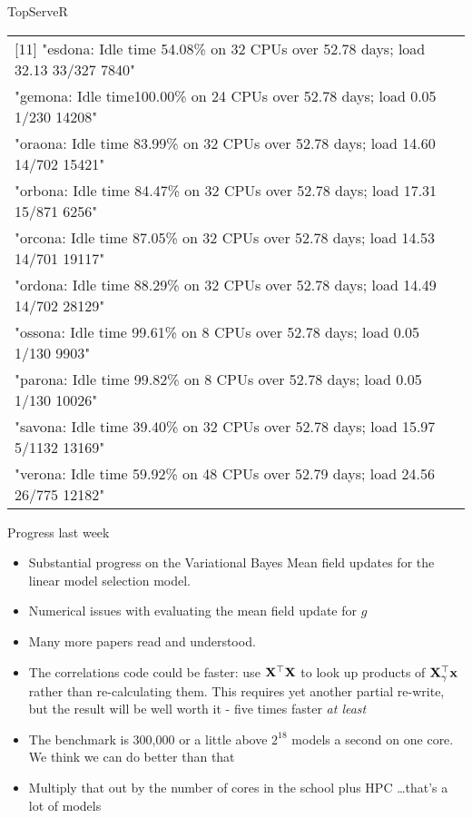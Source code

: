 \documentclass{beamer}
\begin{document}
\begin{frame}{TopServeR}
\begin{itemize}
\begin{tabular}{l}
[11] "esdona: Idle time 54.08\% on 32 CPUs over  52.78 days; load 32.13 33/327 7840"  \\
[12] "gemona: Idle time100.00\% on 24 CPUs over  52.78 days; load 0.05 1/230 14208"   \\
[13] "oraona: Idle time 83.99\% on 32 CPUs over  52.78 days; load 14.60 14/702 15421" \\
[14] "orbona: Idle time 84.47\% on 32 CPUs over  52.78 days; load 17.31 15/871 6256"  \\
[15] "orcona: Idle time 87.05\% on 32 CPUs over  52.78 days; load 14.53 14/701 19117" \\
[16] "ordona: Idle time 88.29\% on 32 CPUs over  52.78 days; load 14.49 14/702 28129" \\
[17] "ossona: Idle time 99.61\% on  8 CPUs over  52.78 days; load 0.05 1/130 9903"    \\
[18] "parona: Idle time 99.82\% on  8 CPUs over  52.78 days; load 0.05 1/130 10026"   \\
[19] "savona: Idle time 39.40\% on 32 CPUs over  52.78 days; load 15.97 5/1132 13169" \\
[20] "verona: Idle time 59.92\% on 48 CPUs over  52.79 days; load 24.56 26/775 12182" \\
\end{tabular}
\end{itemize}
\end{frame}

\begin{frame}{Progress last week}
\begin{itemize}
\item Substantial progress on the Variational Bayes Mean field updates for the linear model selection model.
\item Numerical issues with evaluating the mean field update for $g$
\item Many more papers read and understood.
\item The correlations code could be faster: use ${\bf X}^\top {\bf X}$ to look up products of ${\bf X}_\gamma^\top {\bf x}$
rather than re-calculating them. This requires yet another partial re-write, but the result will be well worth
it - five times faster \emph{at least}
\item The benchmark is 300,000 or a little above $2^{18}$ models a second on one core. We think we can do better than that
\item Multiply that out by the number of cores in the school plus HPC \ldots that's a lot of models
\end{itemize}
\end{frame}
\end{document}
